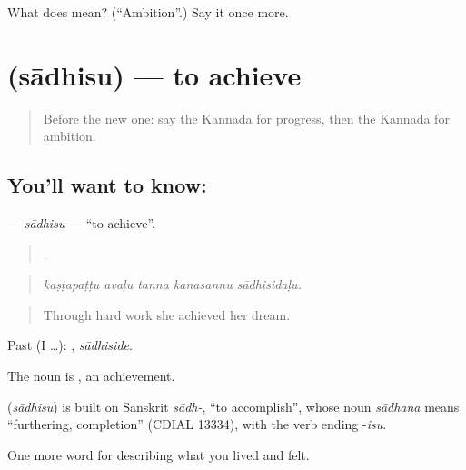 \begin{tcolorbox}[breakable,colback=teal!4,colframe=teal!35!black,title={Before you move on}]
What does  mean? (\textquotedblleft{}Ambition\textquotedblright{}.) Say it once more.
\end{tcolorbox}
\section[\texorpdfstring{\kn{ಸಾಧಿಸು} (sādhisu)}{ಸಾಧಿಸು (sādhisu)}]{ (sādhisu) — to achieve}

\label{lesson:KA-C517-sadhisu}



\begin{quote}
Before the new one: say the Kannada for progress, then the Kannada for ambition.
\end{quote}

\subsection*{You'll want to know: }
\textbf{} — \emph{sādhisu} — \textquotedblleft{}to achieve\textquotedblright{}.

\begin{quote}
    .
\end{quote}

\begin{quote}
\emph{kaṣṭapaṭṭu avaḷu tanna kanasannu sādhisidaḷu.}
\end{quote}

\begin{quote}
Through hard work she achieved her dream.
\end{quote}

Past (I …): , \emph{sādhiside}.

The noun is , an achievement.

\begin{cousinweb}
\textbf{} (\emph{sādhisu}) is built on Sanskrit \emph{sādh-}, \textquotedblleft{}to accomplish\textquotedblright{}, whose noun \emph{sādhana} means \textquotedblleft{}furthering, completion\textquotedblright{} (CDIAL 13334), with the verb ending -\emph{isu}.
\end{cousinweb}

\begin{grammarlens}[title={What you've built}]
One more word for describing what you lived and felt.
\end{grammarlens}

